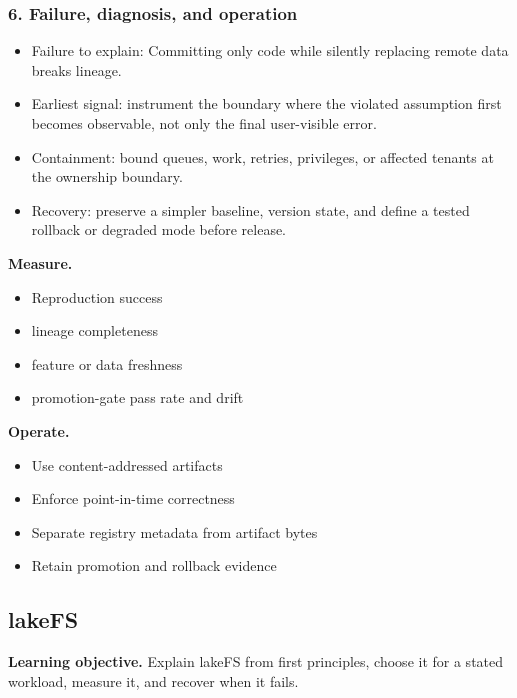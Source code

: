 \subsubsection*{6. Failure, diagnosis, and operation}
\begin{itemize}
\item Failure to explain: Committing only code while silently replacing remote data breaks lineage.
\item Earliest signal: instrument the boundary where the violated assumption first becomes observable, not only the final user-visible error.
\item Containment: bound queues, work, retries, privileges, or affected tenants at the ownership boundary.
\item Recovery: preserve a simpler baseline, version state, and define a tested rollback or degraded mode before release.
\end{itemize}
\textbf{Measure.}\begin{itemize}
\item Reproduction success
\item lineage completeness
\item feature or data freshness
\item promotion-gate pass rate and drift
\end{itemize}
\textbf{Operate.}\begin{itemize}
\item Use content-addressed artifacts
\item Enforce point-in-time correctness
\item Separate registry metadata from artifact bytes
\item Retain promotion and rollback evidence
\end{itemize}
\subsection{lakeFS}
\textbf{Learning objective.} Explain lakeFS from first principles, choose it for a stated workload, measure it, and recover when it fails.
